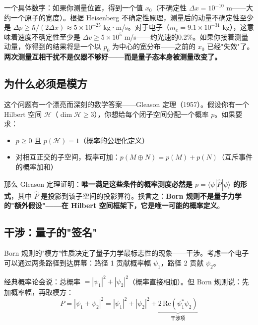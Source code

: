 一个具体数字：如果你测量位置，得到一个值 $x_0$（不确定性 $\Delta x = 10^{-10}$ m——大约一个原子的宽度）。根据 Heisenberg 不确定性原理，测量后的动量不确定性至少是 $\Delta p \ge \hbar/(2\Delta x) \approx 5 \times 10^{-25}$ kg·m/s。对于电子（$m_e = 9.1\times10^{-31}$ kg），这意味着速度不确定性至少是 $\Delta v \ge 5\times10^5$ m/s——约光速的0.2\%。如果你接着测量动量，你得到的结果将是一个以 $p_0$ 为中心的宽分布——之前的 $x_0$ 已经"失效"了。\textbf{两次测量互相干扰不是仪器不够好——而是量子态本身被测量改变了。}

\subsection{为什么必须是模方}

这个问题有一个漂亮而深刻的数学答案——Gleason 定理（1957）。假设你有一个 Hilbert 空间 $\mathcal{H}$（$\dim\mathcal{H} \ge 3$），你想给每个闭子空间分配一个概率 $p$。如果要求：
\begin{itemize}
\item $p \ge 0$ 且 $p(\mathcal{H}) = 1$（概率的公理化定义）
\item 对相互正交的子空间，概率可加：$p(M \oplus N) = p(M) + p(N)$（互斥事件的概率加和）
\end{itemize}

那么 Gleason 定理证明：\textbf{唯一满足这些条件的概率测度必然是 $p = \langle\psi|\hat{P}|\psi\rangle$ 的形式}，其中 $\hat{P}$ 是投影到该子空间的投影算符。换言之：\textbf{Born 规则不是量子力学的"额外假设"——在 Hilbert 空间框架下，它是唯一可能的概率定义}。


\subsection{干涉：量子的"签名"}

Born 规则的"模方"性质决定了量子力学最标志性的现象——干涉。考虑一个电子可以通过两条路径到达屏幕：路径 1 贡献概率幅 $\psi_1$，路径 2 贡献 $\psi_2$。

经典概率论会说：总概率 $= |\psi_1|^2 + |\psi_2|^2$（概率直接相加）。但 Born 规则说：先加概率幅，再取模方：
\[
P = |\psi_1 + \psi_2|^2 = |\psi_1|^2 + |\psi_2|^2 + \underbrace{2\,\text{Re}(\psi_1^*\psi_2)}_{\text{干涉项}}
\]

